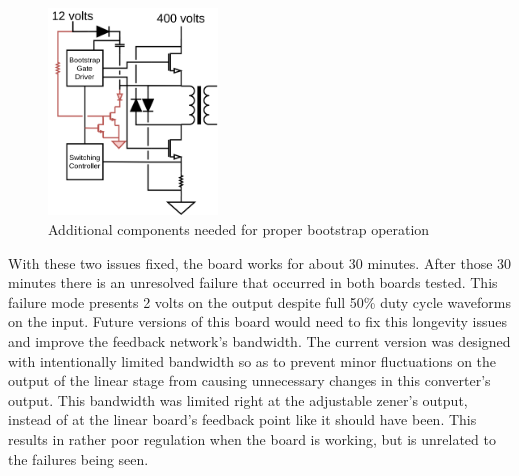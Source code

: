 \documentclass[15pt]{article}
\begin{document}
\begin{figure}[H]
    \begin{center}
    \includegraphics[width=0.4\textwidth]{iso}
    \end{center}
    \caption{Additional components needed for proper bootstrap operation}
    \label{fig:iso}
\end{figure}

With these two issues fixed, the board works for about 30 minutes. After those 30 minutes there is an unresolved failure that occurred in both boards tested. This failure mode presents 2 volts on the output despite full 50\% duty cycle waveforms on the input. Future versions of this board would need to fix this longevity issues and improve the feedback network's bandwidth. The current version was designed with intentionally limited bandwidth so as to prevent minor fluctuations on the output of the linear stage from causing unnecessary changes in this converter's output. This bandwidth was limited right at the adjustable zener's output, instead of at the linear board's feedback point like it should have been. This results in rather poor regulation when the board is working, but is unrelated to the failures being seen.
\end{document}
